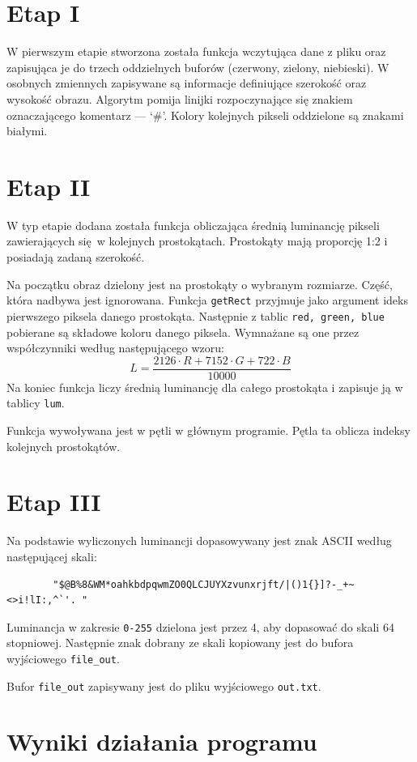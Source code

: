 \documentclass[polish, 11pt]{article}
\begin{document}
\section{Etap I}
    W pierwszym etapie stworzona została funkcja wczytująca dane z pliku oraz zapisująca je do trzech oddzielnych buforów (czerwony, zielony, niebieski).
    W osobnych zmiennych zapisywane są informacje definiujące szerokość oraz wysokość obrazu.
    Algorytm pomija linijki rozpoczynające się znakiem oznaczającego komentarz --- `\#'.
    Kolory kolejnych pikseli oddzielone są znakami białymi.
    
    

\section{Etap II}
    W typ etapie dodana została funkcja obliczająca średnią luminancję pikseli zawierających się w kolejnych prostokątach.
    Prostokąty mają proporcję 1:2 i posiadają zadaną szerokość.
    
    Na początku obraz dzielony jest na prostokąty o wybranym rozmiarze.
    Część, która nadbywa jest ignorowana.
    Funkcja \verb|getRect| przyjmuje jako argument ideks pierwszego piksela danego prostokąta.
    Następnie z tablic \verb|red, green, blue| pobierane są składowe koloru danego piksela.
    Wymnażane są one przez współczynniki według następującego wzoru:
    \begin{displaymath}
        L = \frac{2126\cdot R+7152\cdot G+722\cdot B}{10000}
    \end{displaymath}
    Na koniec funkcja liczy średnią luminancję dla całego prostokąta i zapisuje ją w tablicy \verb|lum|.

    Funkcja wywoływana jest w pętli w głównym programie.
    Pętla ta oblicza indeksy kolejnych prostokątów.

    
    

\section{Etap III}
    Na podstawie wyliczonych luminancji dopasowywany jest znak ASCII według następującej skali:\\
    \begin{verbatim}
        "$@B%8&WM*oahkbdpqwmZO0QLCJUYXzvunxrjft/|()1{}]?-_+~<>i!lI:,^`'. "
    \end{verbatim}
    Luminancja w zakresie \verb|0-255| dzielona jest przez 4, aby dopasować do skali 64 stopniowej.
    Następnie znak dobrany ze skali kopiowany jest do bufora wyjściowego \verb|file_out|.

    Bufor \verb|file_out| zapisywany jest do pliku wyjściowego \verb|out.txt|.
    
    

\section{Wyniki działania programu}
\end{document}
